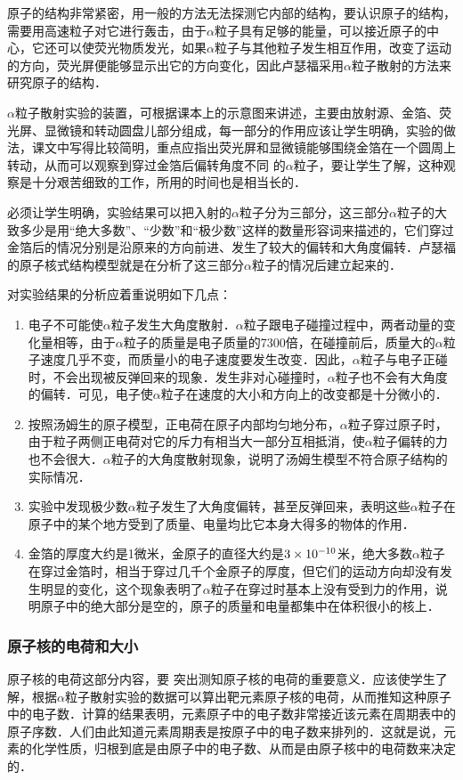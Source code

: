 原子的结构非常紧密，用一般的方法无法探测它内部的结构，要认识原子的结构，需要用高速粒子对它进行轰击，由于$\alpha$粒子具有足够的能量，可以接近原子的中心，它还可以使荧光物质发光，如果$\alpha$粒子与其他粒子发生相互作用，改变了运动的方向，荧光屏便能够显示出它的方向变化，因此卢瑟福采用$\alpha$粒子散射的方法来研究原子的结构．

$\alpha$粒子散射实验的装置，可根据课本上的示意图来讲述，主要由放射源、金箔、荧光屏、显微镜和转动圆盘儿部分组成，每一部分的作用应该让学生明确，实验的做法，课文中写得比较简明，重点应指出荧光屏和显微镜能够围绕金箔在一个圆周上转动，从而可以观察到穿过金箔后偏转角度不同
的$\alpha$粒子，要让学生了解，这种观察是十分艰苦细致的工作，所用的时间也是相当长的．

必须让学生明确，实验结果可以把入射的$\alpha$粒子分为三部分，这三部分$\alpha$粒子的大致多少是用“绝大多数”、“少数”和“极少数”这样的数量形容词来描述的，它们穿过金箔后的情况分别是沿原来的方向前进、发生了较大的偏转和大角度偏转．卢瑟福的原子核式结构模型就是在分析了这三部分$\alpha$粒子的情况后建立起来的．

对实验结果的分析应着重说明如下几点：
\begin{enumerate}
\item 电子不可能使$\alpha$粒子发生大角度散射．$\alpha$粒子跟电子碰撞过程中，两者动量的变化量相等，由于$\alpha$粒子的质量是电子质量的7300倍，在碰撞前后，质量大的$\alpha$粒子速度几乎不变，而质量小的电子速度要发生改变．因此，$\alpha$粒子与电子正碰时，不会出现被反弹回来的现象．发生非对心碰撞时，$\alpha$粒子也不会有大角度的偏转．可见，电子使$\alpha$粒子在速度的大小和方向上的改变都是十分微小的．
\item 按照汤姆生的原子模型，正电荷在原子内部均匀地分布，$\alpha$粒子穿过原子时，由于粒子两侧正电荷对它的斥力有相当大一部分互相抵消，使$\alpha$粒子偏转的力也不会很大．$\alpha$粒子的大角度散射现象，说明了汤姆生模型不符合原子结构的实际情况．
\item 实验中发现极少数$\alpha$粒子发生了大角度偏转，甚至反弹回来，表明这些$\alpha$粒子在原子中的某个地方受到了质量、电量均比它本身大得多的物体的作用．
\item 金箔的厚度大约是1微米，金原子的直径大约是$3\times10^{-10}$米，绝大多数$\alpha$粒子在穿过金箔时，相当于穿过几千个金原子的厚度，但它们的运动方向却没有发生明显的变化，这个现象表明了$\alpha$粒子在穿过时基本上没有受到力的作用，说明原子中的绝大部分是空的，原子的质量和电量都集中在体积很小的核上．
\end{enumerate}

\subsubsection{原子核的电荷和大小}
 原子核的电荷这部分内容，要
突出测知原子核的电荷的重要意义．应该使学生了解，根据$\alpha$粒子散射实验的数据可以算出靶元素原子核的电荷，从而推知这种原子中的电子数．计算的结果表明，元素原子中的电子数非常接近该元素在周期表中的原子序数．人们由此知道元素周期表是按原子中的电子数来排列的．这就是说，元素的化学性质，归根到底是由原子中的电子数、从而是由原子核中的电荷数来决定的．


